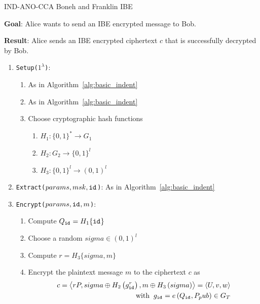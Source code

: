 \begin{algorithm}
\caption{IND-ANO-CCA Boneh and Franklin IBE~\cite{art:BonehF01}}
\label{alg:full_indent}
\begin{description}
 \item \textbf{Goal}: Alice wants to send an IBE encrypted message to Bob.
 
 \item \textbf{Result}: Alice sends an IBE encrypted ciphertext $c$ that is successfully decrypted by Bob.
\end{description}
 \begin{enumerate}
  \item \texttt{Setup($1^{\lambda}$)}: 
  \begin{enumerate}
   \item As in Algorithm~\ref{alg:basic_indent}
   \item As in Algorithm~\ref{alg:basic_indent}
   \item Choose cryptographic hash functions
    \begin{enumerate}
     \item $H_1: \{ 0,1  \}^* \rightarrow G_1$
     \item $H_2: G_2 \rightarrow \{ 0,1 \}^l$
     \item $H_3: \{ 0,1 \}^l \rightarrow \left( 0,1 \right)^l$
    \end{enumerate}
  \end{enumerate}
  \item \texttt{Extract($params, msk, \mathtt{id}_{}$)}: As in Algorithm~\ref{alg:basic_indent}
   \item \texttt{Encrypt($params, \mathtt{id}_{}, m$)}:
   \begin{enumerate}
    \item Compute $Q_{\mathtt{id}_{}} = H_1 \{ \mathtt{id}_{} \}$
    \item Choose a random $sigma \in \left( 0,1 \right)^l$
    \item Compute $r = H_3 \{ sigma, m \}$
    \item Encrypt the plaintext message $m$ to the ciphertext $c$ as
    \begin{equation*}
     \begin{split}
      c = \left< rP, sigma \oplus H_2 \left( g_{\mathtt{id}_{}}^r\right), m \oplus H_3 \left( sigma \right) \right> = \left< U, v, w \right> \\ 
     \; \; \textrm{with} \; \; g_{\mathtt{id}_{}} = e \left( Q_{\mathtt{id}_{}}, P_pub \right) \in G_T
     \end{split}
    \end{equation*}

\end{enumerate}
\end{enumerate}
\end{algorithm}
